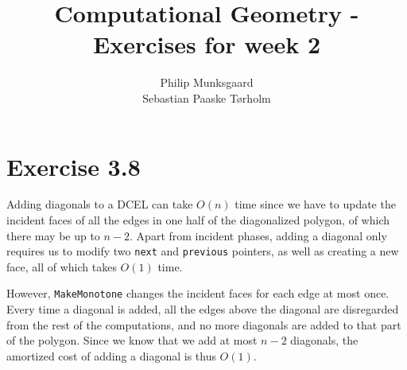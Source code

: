 \documentclass[11pt,a4paper]{article}
\title{Computational Geometry - Exercises for week 2}
\author{Philip Munksgaard\\Sebastian Paaske Tørholm}
\begin{document}
\maketitle

\section{Exercise 3.8}

Adding diagonals to a DCEL can take $O(n)$ time since we have to
update the incident faces of all the edges in one half of the
diagonalized polygon, of which there may be up to $n-2$. Apart from
incident phases, adding a diagonal only requires us to modify two
\texttt{next} and \texttt{previous} pointers, as well as creating a
new face, all of which takes $O(1)$ time.

However, \texttt{MakeMonotone} changes the incident faces for each
edge at most once. Every time a diagonal is added, all the edges above
the diagonal are disregarded from the rest of the computations, and no
more diagonals are added to that part of the polygon. Since we know
that we add at most $n-2$ diagonals, the amortized cost of adding a
diagonal is thus $O(1)$.
\end{document}
